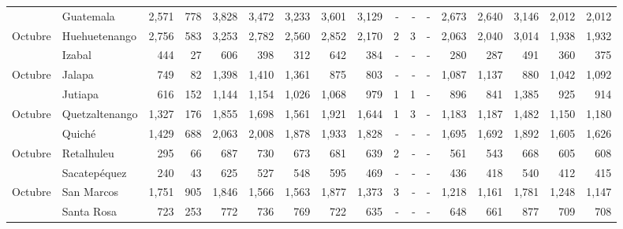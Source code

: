 \begin{landscape}
\begin{center}
\begin{longtable}{llrrrrrrrrrrrrrrr}
			\rowcolor{color1!5!white}\multicolumn{1}{l}{	\footnotesize	 Octubre 	}&	 Guatemala 	&	 2,571 	&	 778 	&	 3,828 	&	 3,472 	&	 3,233 	&	 3,601 	&	 3,129 	&	 -   	&	 -   	&	 -   	&	 2,673 	&	 2,640 	&	 3,146 	&	 2,012 	&	 2,012 	\\
			\multicolumn{1}{l}{	\footnotesize	 Octubre 	}&	 Huehuetenango 	&	 2,756 	&	 583 	&	 3,253 	&	 2,782 	&	 2,560 	&	 2,852 	&	 2,170 	&	 2 	&	 3 	&	 -   	&	 2,063 	&	 2,040 	&	 3,014 	&	 1,938 	&	 1,932 	\\
			\rowcolor{color1!5!white}\multicolumn{1}{l}{	\footnotesize	 Octubre 	}&	 Izabal 	&	 444 	&	 27 	&	 606 	&	 398 	&	 312 	&	 642 	&	 384 	&	 -   	&	 -   	&	 -   	&	 280 	&	 287 	&	 491 	&	 360 	&	 375 	\\
			\multicolumn{1}{l}{	\footnotesize	 Octubre 	}&	 Jalapa 	&	 749 	&	 82 	&	 1,398 	&	 1,410 	&	 1,361 	&	 875 	&	 803 	&	 -   	&	 -   	&	 -   	&	 1,087 	&	 1,137 	&	 880 	&	 1,042 	&	 1,092 	\\
			\rowcolor{color1!5!white}\multicolumn{1}{l}{	\footnotesize	 Octubre 	}&	 Jutiapa 	&	 616 	&	 152 	&	 1,144 	&	 1,154 	&	 1,026 	&	 1,068 	&	 979 	&	 1 	&	 1 	&	 -   	&	 896 	&	 841 	&	 1,385 	&	 925 	&	 914 	\\
			\multicolumn{1}{l}{	\footnotesize	 Octubre 	}&	 Quetzaltenango 	&	 1,327 	&	 176 	&	 1,855 	&	 1,698 	&	 1,561 	&	 1,921 	&	 1,644 	&	 1 	&	 3 	&	 -   	&	 1,183 	&	 1,187 	&	 1,482 	&	 1,150 	&	 1,180 	\\
			\rowcolor{color1!5!white}\multicolumn{1}{l}{	\footnotesize	 Octubre 	}&	 Quiché 	&	 1,429 	&	 688 	&	 2,063 	&	 2,008 	&	 1,878 	&	 1,933 	&	 1,828 	&	 -   	&	 -   	&	 -   	&	 1,695 	&	 1,692 	&	 1,892 	&	 1,605 	&	 1,626 	\\
			\multicolumn{1}{l}{	\footnotesize	 Octubre 	}&	 Retalhuleu 	&	 295 	&	 66 	&	 687 	&	 730 	&	 673 	&	 681 	&	 639 	&	 2 	&	 -   	&	 -   	&	 561 	&	 543 	&	 668 	&	 605 	&	 608 	\\
			\rowcolor{color1!5!white}\multicolumn{1}{l}{	\footnotesize	 Octubre 	}&	 Sacatepéquez 	&	 240 	&	 43 	&	 625 	&	 527 	&	 548 	&	 595 	&	 469 	&	 -   	&	 -   	&	 -   	&	 436 	&	 418 	&	 540 	&	 412 	&	 415 	\\
			\multicolumn{1}{l}{	\footnotesize	 Octubre 	}&	 San Marcos 	&	 1,751 	&	 905 	&	 1,846 	&	 1,566 	&	 1,563 	&	 1,877 	&	 1,373 	&	 3 	&	 -   	&	 -   	&	 1,218 	&	 1,161 	&	 1,781 	&	 1,248 	&	 1,147 	\\
			\rowcolor{color1!5!white}\multicolumn{1}{l}{	\footnotesize	 Octubre 	}&	 Santa Rosa 	&	 723 	&	 253 	&	 772 	&	 736 	&	 769 	&	 722 	&	 635 	&	 -   	&	 -   	&	 -   	&	 648 	&	 661 	&	 877 	&	 709 	&	 708 	\\

\end{longtable}
\end{center}
\end{landscape}
